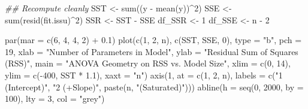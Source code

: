 \documentclass[
  letterpaper,
]{scrbook}
\newenvironment{Shaded}{\begin{snugshade}}{\end{snugshade}}
\newcommand{\AttributeTok}[1]{\textcolor[rgb]{0.40,0.45,0.13}{#1}}
\newcommand{\DecValTok}[1]{\textcolor[rgb]{0.68,0.00,0.00}{#1}}
\newcommand{\DocumentationTok}[1]{\textcolor[rgb]{0.37,0.37,0.37}{\textit{#1}}}
\newcommand{\FloatTok}[1]{\textcolor[rgb]{0.68,0.00,0.00}{#1}}
\newcommand{\FunctionTok}[1]{\textcolor[rgb]{0.28,0.35,0.67}{#1}}
\newcommand{\NormalTok}[1]{\textcolor[rgb]{0.00,0.23,0.31}{#1}}
\newcommand{\OtherTok}[1]{\textcolor[rgb]{0.00,0.23,0.31}{#1}}
\newcommand{\SpecialCharTok}[1]{\textcolor[rgb]{0.37,0.37,0.37}{#1}}
\newcommand{\StringTok}[1]{\textcolor[rgb]{0.13,0.47,0.30}{#1}}
\begin{document}
\begin{Shaded}
\begin{Highlighting}[]
\DocumentationTok{\#\# Recompute cleanly}
\NormalTok{SST }\OtherTok{\textless{}{-}} \FunctionTok{sum}\NormalTok{((y }\SpecialCharTok{{-}} \FunctionTok{mean}\NormalTok{(y))}\SpecialCharTok{\^{}}\DecValTok{2}\NormalTok{)}
\NormalTok{SSE }\OtherTok{\textless{}{-}} \FunctionTok{sum}\NormalTok{(}\FunctionTok{resid}\NormalTok{(fit.issu)}\SpecialCharTok{\^{}}\DecValTok{2}\NormalTok{)}
\NormalTok{SSR }\OtherTok{\textless{}{-}}\NormalTok{ SST }\SpecialCharTok{{-}}\NormalTok{ SSE}
\NormalTok{df\_SSR }\OtherTok{\textless{}{-}} \DecValTok{1}
\NormalTok{df\_SSE }\OtherTok{\textless{}{-}}\NormalTok{ n }\SpecialCharTok{{-}} \DecValTok{2}

\FunctionTok{par}\NormalTok{(}\AttributeTok{mar =} \FunctionTok{c}\NormalTok{(}\DecValTok{6}\NormalTok{, }\DecValTok{4}\NormalTok{, }\DecValTok{4}\NormalTok{, }\DecValTok{2}\NormalTok{) }\SpecialCharTok{+} \FloatTok{0.1}\NormalTok{)}
\FunctionTok{plot}\NormalTok{(}\FunctionTok{c}\NormalTok{(}\DecValTok{1}\NormalTok{, }\DecValTok{2}\NormalTok{, n), }\FunctionTok{c}\NormalTok{(SST, SSE, }\DecValTok{0}\NormalTok{), }\AttributeTok{type =} \StringTok{"b"}\NormalTok{, }\AttributeTok{pch =} \DecValTok{19}\NormalTok{,}
     \AttributeTok{xlab =} \StringTok{"Number of Parameters in Model"}\NormalTok{,}
     \AttributeTok{ylab =} \StringTok{"Residual Sum of Squares (RSS)"}\NormalTok{,}
     \AttributeTok{main =} \StringTok{"ANOVA Geometry on RSS vs. Model Size"}\NormalTok{,}
     \AttributeTok{xlim =} \FunctionTok{c}\NormalTok{(}\DecValTok{0}\NormalTok{, }\DecValTok{14}\NormalTok{), }\AttributeTok{ylim =} \FunctionTok{c}\NormalTok{(}\SpecialCharTok{{-}}\DecValTok{400}\NormalTok{, SST }\SpecialCharTok{*} \FloatTok{1.1}\NormalTok{), }\AttributeTok{xaxt =} \StringTok{"n"}\NormalTok{)}
\FunctionTok{axis}\NormalTok{(}\DecValTok{1}\NormalTok{, }\AttributeTok{at =} \FunctionTok{c}\NormalTok{(}\DecValTok{1}\NormalTok{, }\DecValTok{2}\NormalTok{, n), }\AttributeTok{labels =} \FunctionTok{c}\NormalTok{(}\StringTok{"1 (Intercept)"}\NormalTok{, }\StringTok{"2 (+Slope)"}\NormalTok{, }\FunctionTok{paste}\NormalTok{(n, }\StringTok{"(Saturated)"}\NormalTok{)))}
\FunctionTok{abline}\NormalTok{(}\AttributeTok{h =} \FunctionTok{seq}\NormalTok{(}\DecValTok{0}\NormalTok{, }\DecValTok{2000}\NormalTok{, }\AttributeTok{by =} \DecValTok{100}\NormalTok{), }\AttributeTok{lty =} \DecValTok{3}\NormalTok{, }\AttributeTok{col =} \StringTok{"grey"}\NormalTok{)}


\end{Highlighting}
\end{Shaded}
\end{document}
